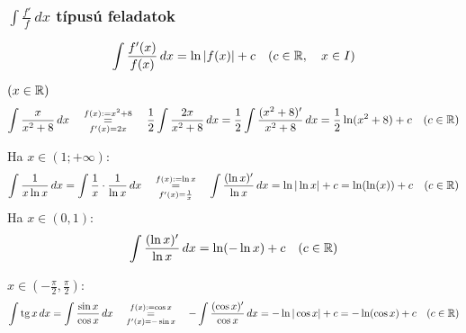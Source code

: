 \documentclass[a4paper,11.5pt]{article}
\DeclareMathOperator{\tg}{tg}
\begin{document}
	\subsubsection{$\int\frac{f'}{f}\,dx$ típusú feladatok}
	\begin{task}
		\[ \int\frac{f'(x)}{f(x)}\,dx=\ln |f(x)|+c \quad (c\in\mathbb{R}, \quad x\in I)\]
	\end{task}
	\begin{task}$(x\in\mathbb{R})$
		\[ \int\frac{x}{x^2+8}\,dx\quad \overset{f(x):=x^2+8}{\underset{f'(x)=2x}{=}}\quad\frac{1}{2}\int\frac{2x}{x^2+8}\,dx=\frac{1}{2}\int\frac{(x^2+8)'}{x^2+8}\,dx=\frac{1}{2}\ln(x^2+8)+c\quad (c\in\mathbb{R})  \]
	\end{task}
	\begin{task}Ha $x\in(1;+\infty)$:
		\[ \int\frac{1}{x\ln x}\,dx= \int\frac{1}{x}\cdot\frac{1}{\ln x}\,dx\quad \overset{f(x):=\ln x}{\underset{f'(x)=\frac{1}{x}}{=}}\quad \int\frac{(\ln x)'}{\ln x}\,dx=\ln|\ln x|+c=\ln(\ln(x))+c\quad (c\in\mathbb{R}) \]
		Ha $x\in(0,1)$:
		\[ \int\frac{(\ln x)'}{\ln x}\,dx=\ln(-\ln x)+c\quad (c\in\mathbb{R}) \]
	\end{task}
	\begin{task}$x\in\left(-\frac{\pi}{2},\frac{\pi}{2}\right)$:
		\[ \int\tg x\,dx=\int\frac{\sin x}{\cos x}\,dx\quad \overset{f(x):=\cos x}{\underset{f'(x)=-\sin x}{=}}\quad -\int\frac{(\cos x)'}{\cos x}\,dx=-\ln|\cos x|+c=-\ln(\cos x)+c\quad (c\in\R) \]
	\end{task}
\end{document}
